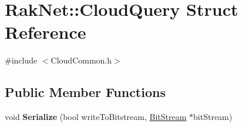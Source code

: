 \hypertarget{struct_rak_net_1_1_cloud_query}{\section{Rak\-Net\-:\-:Cloud\-Query Struct Reference}
\label{struct_rak_net_1_1_cloud_query}
}


{\ttfamily \#include $<$Cloud\-Common.\-h$>$}

\subsection*{Public Member Functions}
\begin{DoxyCompactItemize}
\item 
\hypertarget{struct_rak_net_1_1_cloud_query_a158dc88e85971ce14259561ec2a96809}{void {\bfseries Serialize} (bool write\-To\-Bitstream, \hyperlink{class_rak_net_1_1_bit_stream}{Bit\-Stream} $\ast$bit\-Stream)}\label{struct_rak_net_1_1_cloud_query_a158dc88e85971ce14259561ec2a96809}

\end{DoxyCompactItemize}
